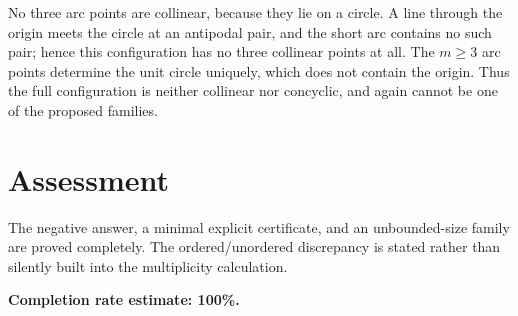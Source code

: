 \documentclass[11pt]{article}
\begin{document}
No three arc points are collinear, because they lie on a circle. A line through the origin meets the circle at an antipodal pair, and the short arc contains no such pair; hence this configuration has no three collinear points at all. The $m\ge3$ arc points determine the unit circle uniquely, which does not contain the origin. Thus the full configuration is neither collinear nor concyclic, and again cannot be one of the proposed families.

\section*{Assessment}
The negative answer, a minimal explicit certificate, and an unbounded-size family are proved completely. The ordered/unordered discrepancy is stated rather than silently built into the multiplicity calculation.

\textbf{Completion rate estimate: 100\%.}
\end{document}

